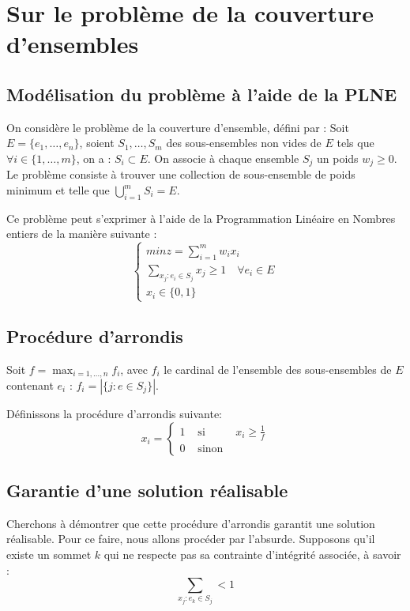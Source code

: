 \section{Sur le problème de la couverture d'ensembles}

\subsection{Modélisation du problème à l'aide de la PLNE}

On considère le problème de la couverture d'ensemble, défini par :
Soit $E = \lbrace e_1, \dots, e_n \rbrace$, soient $S_1, \dots, S_m$ des sous-ensembles non vides
de $E$ tels que $\forall i \in \{1, \dots, m\}$, on a : $S_i \subset E$. On associe à chaque
ensemble $S_j$ un poids $w_j \geq 0$. Le problème consiste à trouver une collection de sous-ensemble
de poids minimum et telle que $\bigcup\limits_{i=1}^m S_i = E$.

Ce problème peut s'exprimer à l'aide de la Programmation Linéaire en Nombres entiers de la manière
suivante : $$
\left \lbrace
\begin{array}{l}
	min z = \sum_{i=1}^m w_ix_i \\
	\sum\limits_{x_j : e_i \in S_j} x_j \geq 1 \quad \forall e_i \in E \\
	x_i \in \{0, 1\}
\end{array} \right.
$$

\subsection{Procédure d'arrondis}

Soit $f = \max_{i=1,\dots,n} f_i$, avec $f_i$ le cardinal de l'ensemble des sous-ensembles de $E$
contenant $e_i$ : $ f_i = |\{j : e \in S_j\}|$.

Définissons la procédure d'arrondis suivante: $$
x_i = \left \{ \begin{array}{rcl}
		1 & \mbox{ si } & x_i \geq \frac{1}{f} \\
		0 & \mbox{ sinon } &
	\end{array} \right .
	$$

\subsection{Garantie d'une solution réalisable}
Cherchons à démontrer que cette procédure d'arrondis garantit une solution réalisable. Pour ce
faire, nous allons procéder par l'absurde. Supposons qu'il existe un sommet $k$ qui ne respecte pas
sa contrainte d'intégrité associée, à savoir : $$
\sum_{x_j : e_k \in S_j} < 1 $$


